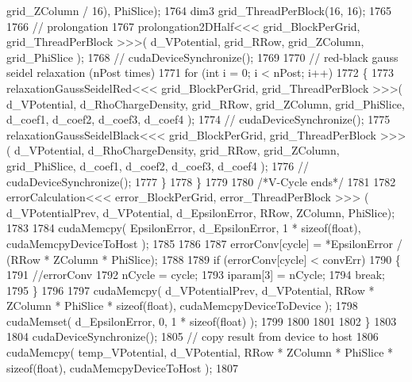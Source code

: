 \begin{DoxyCode}
      grid\_ZColumn / 16), PhiSlice);
1764             dim3 grid\_ThreadPerBlock(16, 16);
1765     
1766             \textcolor{comment}{// prolongation}
1767             prolongation2DHalf<<< grid\_BlockPerGrid, grid\_ThreadPerBlock >>>( d\_VPotential, grid\_RRow, 
      grid\_ZColumn, grid\_PhiSlice );
1768 \textcolor{comment}{//          cudaDeviceSynchronize();}
1769 
1770             \textcolor{comment}{// red-black gauss seidel relaxation (nPost times)}
1771             \textcolor{keywordflow}{for} (\textcolor{keywordtype}{int} i = 0; i < nPost; i++)
1772             \{
1773                 relaxationGaussSeidelRed<<< grid\_BlockPerGrid, grid\_ThreadPerBlock >>>( d\_VPotential, 
      d\_RhoChargeDensity, grid\_RRow, grid\_ZColumn, grid\_PhiSlice, d\_coef1, d\_coef2, d\_coef3, d\_coef4 );
1774 \textcolor{comment}{//              cudaDeviceSynchronize();}
1775                 relaxationGaussSeidelBlack<<< grid\_BlockPerGrid, grid\_ThreadPerBlock >>>( d\_VPotential, 
      d\_RhoChargeDensity, grid\_RRow, grid\_ZColumn, grid\_PhiSlice, d\_coef1, d\_coef2, d\_coef3, d\_coef4 );
1776 \textcolor{comment}{//              cudaDeviceSynchronize();}
1777             \}
1778         \}
1779 
1780     \textcolor{comment}{/*V-Cycle ends*/}
1781 
1782         errorCalculation<<< error\_BlockPerGrid, error\_ThreadPerBlock >>> ( d\_VPotentialPrev, d\_VPotential, 
      d\_EpsilonError, RRow, ZColumn, PhiSlice);
1783 
1784         cudaMemcpy( EpsilonError, d\_EpsilonError, 1 * \textcolor{keyword}{sizeof}(\textcolor{keywordtype}{float}), cudaMemcpyDeviceToHost );      
1785         
1786 
1787         errorConv[cycle] = *EpsilonError  / (RRow * ZColumn * PhiSlice);
1788 
1789         \textcolor{keywordflow}{if} (errorConv[cycle] < convErr)
1790         \{
1791             \textcolor{comment}{//errorConv}
1792             nCycle = cycle;
1793             iparam[3] = nCycle;
1794             \textcolor{keywordflow}{break};
1795         \}
1796 
1797         cudaMemcpy( d\_VPotentialPrev, d\_VPotential, RRow * ZColumn * PhiSlice * \textcolor{keyword}{sizeof}(\textcolor{keywordtype}{float}), 
      cudaMemcpyDeviceToDevice );
1798         cudaMemset( d\_EpsilonError, 0, 1 * \textcolor{keyword}{sizeof}(\textcolor{keywordtype}{float}) );
1799         
1800         
1801         
1802     \}
1803 
1804     cudaDeviceSynchronize();
1805     \textcolor{comment}{// copy result from device to host}
1806     cudaMemcpy( temp\_VPotential, d\_VPotential, RRow * ZColumn * PhiSlice * \textcolor{keyword}{sizeof}(\textcolor{keywordtype}{float}), 
      cudaMemcpyDeviceToHost );
1807 

\end{DoxyCode}
